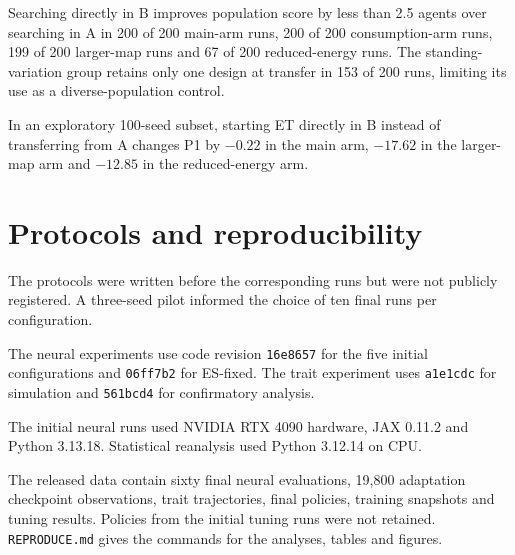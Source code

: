 Searching directly in B improves population score by less than 2.5 agents over searching in A in 200 of 200 main-arm runs, 200 of 200 consumption-arm runs, 199 of 200 larger-map runs and 67 of 200 reduced-energy runs. The standing-variation group retains only one design at transfer in 153 of 200 runs, limiting its use as a diverse-population control.

In an exploratory 100-seed subset, starting ET directly in B instead of transferring from A changes P1 by $-0.22$ in the main arm, $-17.62$ in the larger-map arm and $-12.85$ in the reduced-energy arm.

\section{Protocols and reproducibility}
\label{app:reproduction}
The protocols were written before the corresponding runs but were not publicly registered. A three-seed pilot informed the choice of ten final runs per configuration.

The neural experiments use code revision \texttt{16e8657} for the five initial configurations and \texttt{06ff7b2} for ES-fixed. The trait experiment uses \texttt{a1e1cdc} for simulation and \texttt{561bcd4} for confirmatory analysis.

The initial neural runs used NVIDIA RTX 4090 hardware, JAX 0.11.2 and Python 3.13.18. Statistical reanalysis used Python 3.12.14 on CPU.

The released data contain sixty final neural evaluations, 19,800 adaptation checkpoint observations, trait trajectories, final policies, training snapshots and tuning results. Policies from the initial tuning runs were not retained. \texttt{REPRODUCE.md} gives the commands for the analyses, tables and figures.
